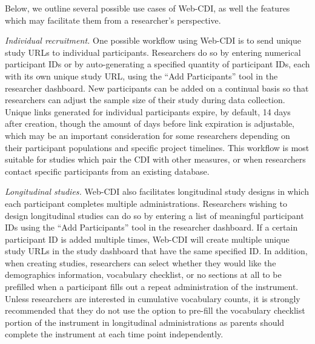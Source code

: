 \documentclass[
  english,
  ,man,floatsintext]{apa6}
\begin{document}
Below, we outline several possible use cases of Web-CDI, as well the features which may facilitate them from a researcher's perspective.

\emph{Individual recruitment.} One possible workflow using Web-CDI is to send unique study URLs to individual participants. Researchers do so by entering numerical participant IDs or by auto-generating a specified quantity of participant IDs, each with its own unique study URL, using the \enquote{Add Participants} tool in the researcher dashboard. New participants can be added on a continual basis so that researchers can adjust the sample size of their study during data collection. Unique links generated for individual participants expire, by default, 14 days after creation, though the amount of days before link expiration is adjustable, which may be an important consideration for some researchers depending on their participant populations and specific project timelines. This workflow is most suitable for studies which pair the CDI with other measures, or when researchers contact specific participants from an existing database.

\emph{Longitudinal studies.} Web-CDI also facilitates longitudinal study designs in which each participant completes multiple administrations. Researchers wishing to design longitudinal studies can do so by entering a list of meaningful participant IDs using the \enquote{Add Participants} tool in the researcher dashboard. If a certain participant ID is added multiple times, Web-CDI will create multiple unique study URLs in the study dashboard that have the same specified ID. In addition, when creating studies, researchers can select whether they would like the demographics information, vocabulary checklist, or no sections at all to be prefilled when a participant fills out a repeat administration of the instrument. Unless researchers are interested in cumulative vocabulary counts, it is strongly recommended that they do not use the option to pre-fill the vocabulary checklist portion of the instrument in longitudinal administrations as parents should complete the instrument at each time point independently.
\end{document}
